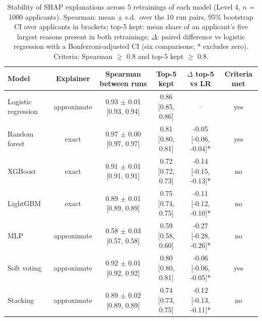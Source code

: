 \begin{table}[t]
\caption{Stability of SHAP explanations across 5 retrainings of each model (Level 4, $n$ = 1000 applicants). Spearman: mean $\pm$ s.d.\ over the 10 run pairs, 95\% bootstrap CI over applicants in brackets; top-5 kept: mean share of an applicant's five largest reasons present in both retrainings; $\Delta$: paired difference vs logistic regression with a Bonferroni-adjusted CI (six comparisons; * excludes zero). Criteria: Spearman $\ge$ 0.8 and top-5 kept $\ge$ 0.8.}
\label{tab:rq3_stability}
\centering
\small
\begin{tabular}{lccccc}
\hline
Model & Explainer & Spearman between runs & Top-5 kept & $\Delta$ top-5 vs LR & Criteria met \\
\hline
Logistic regression & approximate & 0.93 $\pm$ 0.01 [0.93, 0.94] & 0.86 [0.85, 0.86] & -- & yes \\
Random forest & exact & 0.97 $\pm$ 0.00 [0.97, 0.97] & 0.81 [0.80, 0.81] & -0.05 [-0.06, -0.04]* & yes \\
XGBoost & exact & 0.91 $\pm$ 0.01 [0.91, 0.91] & 0.72 [0.72, 0.73] & -0.14 [-0.15, -0.13]* & no \\
LightGBM & exact & 0.89 $\pm$ 0.01 [0.89, 0.89] & 0.75 [0.74, 0.75] & -0.11 [-0.12, -0.10]* & no \\
MLP & approximate & 0.58 $\pm$ 0.03 [0.57, 0.58] & 0.59 [0.58, 0.60] & -0.27 [-0.28, -0.26]* & no \\
Soft voting & approximate & 0.92 $\pm$ 0.01 [0.92, 0.92] & 0.80 [0.80, 0.81] & -0.06 [-0.06, -0.05]* & yes \\
Stacking & approximate & 0.89 $\pm$ 0.02 [0.89, 0.89] & 0.74 [0.73, 0.75] & -0.12 [-0.13, -0.11]* & no \\
\hline
\end{tabular}
\end{table}